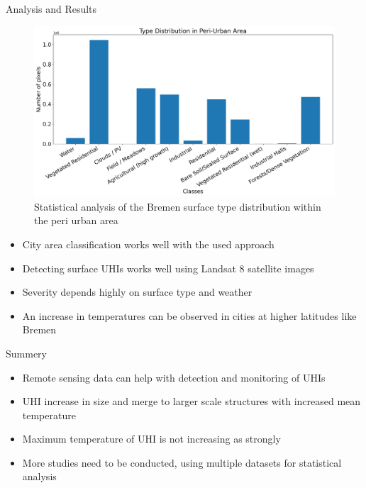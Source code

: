 \documentclass[final,20pt]{beamer}
\newlength{\colwidth}
\begin{document}
\begin{frame}[t]
\begin{columns}[t]
\begin{column}{\colwidth}
  \begin{block}{Analysis and Results}
    \begin{figure}
        \centering
        \includegraphics[width=\linewidth]{figures/ClassDistributionPU2019-06-29.png}
        \caption{Statistical analysis of the Bremen surface type distribution within the peri urban area}
    \end{figure}
\vspace{-0.4em}
    \begin{itemize}
      \setlength\itemsep{0.4em}
      \item City area classification works well with the used approach
      \item Detecting surface UHIs works well using Landsat 8 satellite images
      \item Severity depends highly on surface type and weather
      \item An increase in temperatures can be observed in cities at higher latitudes like Bremen
    \end{itemize}
  \end{block}

  \vspace{-1.5cm}
  \begin{alertblock}{Summery}
    \begin{itemize}
      \setlength\itemsep{0.5em}
      \item Remote sensing data can help with detection and monitoring of UHIs
      \item UHI increase in size and merge to larger scale structures with increased mean temperature
      \item Maximum temperature of UHI is not increasing as strongly 
      \item More studies need to be conducted, using multiple datasets for statistical analysis
    \end{itemize}
  \end{alertblock}


\end{column}
\end{columns}
\end{frame}
\end{document}

